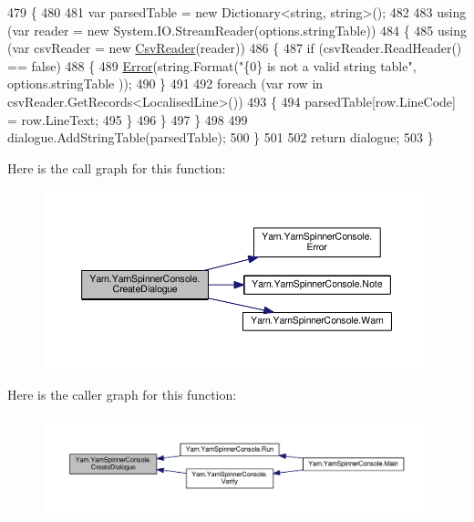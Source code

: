 \begin{DoxyCode}
479             \{
480 
481                 var parsedTable = \textcolor{keyword}{new} Dictionary<string, string>();
482 
483                 \textcolor{keyword}{using} (var reader = \textcolor{keyword}{new} System.IO.StreamReader(options.stringTable))
484                 \{
485                     \textcolor{keyword}{using} (var csvReader = \textcolor{keyword}{new} \hyperlink{a00071}{CsvReader}(reader))
486                     \{
487                         \textcolor{keywordflow}{if} (csvReader.ReadHeader() == \textcolor{keyword}{false})
488                         \{
489                             \hyperlink{a00189_a2f63f9f5b7634cb50ee75ff2eb18b137}{Error}(\textcolor{keywordtype}{string}.Format(\textcolor{stringliteral}{"\{0\} is not a valid string table"}, options.stringTable
      ));
490                         \}
491 
492                         \textcolor{keywordflow}{foreach} (var row \textcolor{keywordflow}{in} csvReader.GetRecords<LocalisedLine>())
493                         \{
494                             parsedTable[row.LineCode] = row.LineText;
495                         \}
496                     \}
497                 \}
498 
499                 dialogue.AddStringTable(parsedTable);
500             \}
501 
502             \textcolor{keywordflow}{return} dialogue;
503         \}
\end{DoxyCode}


Here is the call graph for this function\-:
\nopagebreak
\begin{figure}[H]
\begin{center}
\leavevmode
\includegraphics[width=350pt]{a00189_aab244361a510cee18ad2f636d110e0d5_cgraph}
\end{center}
\end{figure}




Here is the caller graph for this function\-:
\nopagebreak
\begin{figure}[H]
\begin{center}
\leavevmode
\includegraphics[width=350pt]{a00189_aab244361a510cee18ad2f636d110e0d5_icgraph}
\end{center}
\end{figure}



